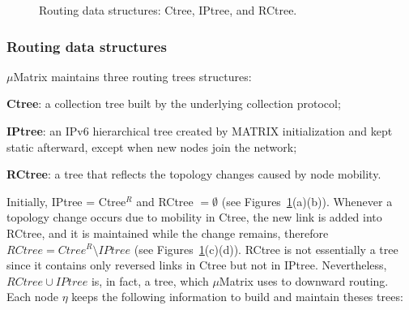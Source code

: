\begin{figure}[!ht]
\begin{center}
{
    }
    
    \caption{Routing data structures: Ctree, IPtree, and RCtree.}
    \label{fig:trees}
\end{center}
\end{figure}


\subsubsection{Routing data structures}
\label{subsubsec:controlDataStructures}

$\mu$Matrix maintains three routing trees structures:
\begin{inparaenum}[i)]
  \item \textbf{Ctree}: a collection tree built by the underlying collection protocol;
  \item \textbf{IPtree}: an IPv6 hierarchical tree created by MATRIX initialization and kept static afterward, except when new nodes join the network;
  \item \textbf{RCtree}: a tree that reflects the topology changes caused by node mobility.
\end{inparaenum}


Initially, IPtree = Ctree$^{R}$ and RCtree $= \emptyset$ (see Figures~\ref{fig:trees}(a)(b)). Whenever a topology change occurs due to mobility in Ctree, the new link is added into RCtree, and it is maintained while the change remains, therefore $RCtree = Ctree^{R} \setminus IPtree$ (see Figures~\ref{fig:trees}(c)(d)). RCtree is not essentially a tree since it contains only reversed links in Ctree but not in IPtree. Nevertheless, $RCtree \cup IPtree$ is, in fact, a tree, which $\mu$Matrix uses to downward routing. Each node $\eta$ keeps the following information to build and maintain theses trees:

